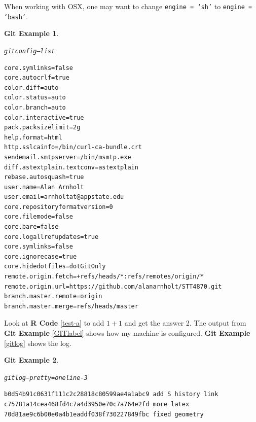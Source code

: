 \documentclass{article}\usepackage[]{graphicx}\usepackage[]{color}
\makeatletter
\newenvironment{kframe}{%
 \def\at@end@of@kframe{}%
 \ifinner\ifhmode%
  \def\at@end@of@kframe{\end{minipage}}%
  \begin{minipage}{\columnwidth}%
 \fi\fi%
 \def\FrameCommand##1{\hskip\@totalleftmargin \hskip-\fboxsep
 \colorbox{shadecolor}{##1}\hskip-\fboxsep
     \hskip-\linewidth \hskip-\@totalleftmargin \hskip\columnwidth}%
 \MakeFramed {\advance\hsize-\width
   \@totalleftmargin\z@ \linewidth\hsize
   \@setminipage}}%
 {\par\unskip\endMakeFramed%
 \at@end@of@kframe}
\newenvironment{knitrout}{}{} %
\theoremstyle{rcode}
\newtheorem{GIT}{Git Example}[section]
\makeatother
\begin{document}
When working with OSX, one may want to change \texttt{engine = `sh'} to \texttt{engine = `bash'}.

\begin{GIT}\label{GITlabel}\hfill{}\begin{knitrout}
\color{fgcolor}\begin{kframe}
\begin{alltt}
git config --list
\end{alltt}

\begin{verbatim}
core.symlinks=false
core.autocrlf=true
color.diff=auto
color.status=auto
color.branch=auto
color.interactive=true
pack.packsizelimit=2g
help.format=html
http.sslcainfo=/bin/curl-ca-bundle.crt
sendemail.smtpserver=/bin/msmtp.exe
diff.astextplain.textconv=astextplain
rebase.autosquash=true
user.name=Alan Arnholt
user.email=arnholtat@appstate.edu
core.repositoryformatversion=0
core.filemode=false
core.bare=false
core.logallrefupdates=true
core.symlinks=false
core.ignorecase=true
core.hidedotfiles=dotGitOnly
remote.origin.fetch=+refs/heads/*:refs/remotes/origin/*
remote.origin.url=https://github.com/alanarnholt/STT4870.git
branch.master.remote=origin
branch.master.merge=refs/heads/master
\end{verbatim}
\end{kframe}
\end{knitrout}\end{GIT}


Look at \textbf{R Code} \vref{test-a} to add $1 + 1$ and get the answer 2. The output from \textbf{Git Example} \vref{GITlabel} shows how my machine is configured. \textbf{Git Example} \vref{gitlog} shows the log.

\begin{GIT}\label{gitlog}\hfill{}\begin{knitrout}
\color{fgcolor}\begin{kframe}
\begin{alltt}
git log --pretty=oneline -3
\end{alltt}

\begin{verbatim}
b0d54b91c0631f111c2c28818c80599ae4a1abc9 add S history link
c75781a14cea468fd4c7a4d3950e70c7a764e2fd more latex
70d81ae9c6b00e0a4b1eaddf038f730227849fbc fixed geometry
\end{verbatim}
\end{kframe}
\end{knitrout}\end{GIT}
\end{document}
